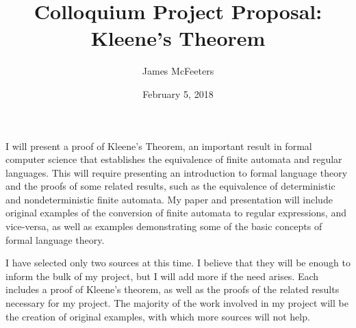 \documentclass[12 pt, letterpaper]{article}
\author{James McFeeters}
\title{Colloquium Project Proposal: Kleene's Theorem}
\date{February 5, 2018}
\begin{document}
\maketitle

\setlength{\parindent}{0 pt}
\setlength{\parskip}{1 em}

I will present a proof of Kleene's Theorem, an important result in formal computer science that establishes the equivalence of finite automata and regular languages.
This will require presenting an introduction to formal language theory and the proofs of some related results, such as the equivalence of deterministic and nondeterministic finite automata. 
My paper and presentation will include original examples of the conversion of finite automata to regular expressions, and vice-versa, as well as examples demonstrating some of the basic concepts of formal language theory.

I have selected only two sources at this time. 
I believe that they will be enough to inform the bulk of my project, but I will add more if the need arises. 
Each includes a proof of Kleene's theorem, as well as the proofs of the related results necessary for my project.
The majority of the work involved in my project will be the creation of original examples, with which more sources will not help.

\clearpage
\nocite{*}


\end{document}
